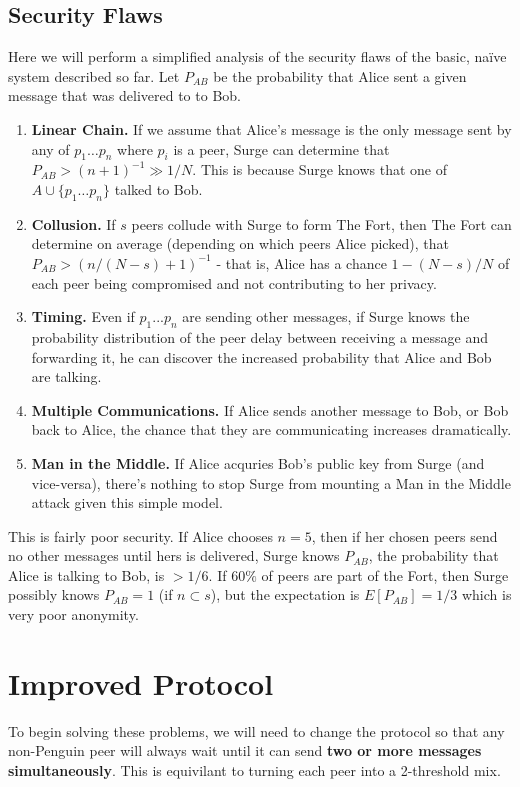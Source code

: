 \documentclass[twocolumn,11pt,english]{article}
\begin{document}
\subsection{Security Flaws}
Here we will perform a simplified analysis of the security flaws of the basic, na\"ive system described so far. 
Let $P_{AB}$ be the probability that Alice sent a given message that was delivered to to Bob. 
\begin{enumerate}
\item\textbf{Linear Chain.} If we assume that Alice's message is the only message sent by any of $p_1 \ldots p_n$ where $p_i$ is a peer, Surge can determine that $P_{AB} > (n+1)^{-1} \gg 1/N$. This is because Surge knows that one of $A \cup \{p_1 \ldots p_n\}$ talked to Bob.
\item\textbf{Collusion.} If $s$ peers collude with Surge to form The Fort, then The Fort can determine on average (depending on which peers Alice picked), that $P_{AB} > (n/(N-s)+1)^{-1}$ - that is, Alice has a chance $1 - (N-s)/N$ of each peer being compromised and not contributing to her privacy.
\item\textbf{Timing.} Even if $p_1 ... p_n$ are sending other messages, if Surge knows the probability distribution of the peer delay between receiving a message and forwarding it, he can discover the increased probability that Alice and Bob are talking. 
\item\textbf{Multiple Communications.} If Alice sends another message to Bob, or Bob back to Alice, the chance that they are communicating increases dramatically. 
\item\textbf{Man in the Middle.} If Alice acquries Bob's public key from Surge (and vice-versa), there's nothing to stop Surge from mounting a Man in the Middle attack given this simple model. 
\end{enumerate}
This is fairly poor security. If Alice chooses $n = 5$, then if her chosen peers send no other messages until hers is delivered, Surge knows $P_{AB}$, the probability that Alice is talking to Bob, is $> 1/6$. If $60\%$ of peers are part of the Fort, then Surge possibly knows $P_{AB} = 1$ (if $n \subset s$), but the expectation is $E[P_{AB}] = 1/3$ which is very poor anonymity.

\section{Improved Protocol}
To begin solving these problems, we will need to change the protocol so that any non-Penguin peer will always wait until it can send \textbf{two or more messages simultaneously}. This is equivilant to turning each peer into a 2-threshold mix. \cite{trickle02}
\end{document}
